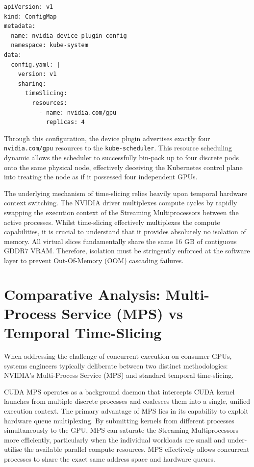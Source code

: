 \begin{listing}[H]
\begin{verbatim}
apiVersion: v1
kind: ConfigMap
metadata:
  name: nvidia-device-plugin-config
  namespace: kube-system
data:
  config.yaml: |
    version: v1
    sharing:
      timeSlicing:
        resources:
          - name: nvidia.com/gpu
            replicas: 4
\end{verbatim}
\caption{NVIDIA Kubernetes Device Plugin Time-Slicing Configuration specifying four logical replicas.}
\label{lst:nvidia_time_slicing}
\end{listing}



Through this configuration, the device plugin advertises exactly four \texttt{nvidia.com/gpu} resources to the \texttt{kube-scheduler}. This resource scheduling dynamic allows the scheduler to successfully bin-pack up to four discrete pods onto the same physical node, effectively deceiving the Kubernetes control plane into treating the node as if it possessed four independent GPUs.

The underlying mechanism of time-slicing relies heavily upon temporal hardware context switching. The NVIDIA driver multiplexes compute cycles by rapidly swapping the execution context of the Streaming Multiprocessors between the active processes. Whilst time-slicing effectively multiplexes the compute capabilities, it is crucial to understand that it provides absolutely no isolation of memory. All virtual slices fundamentally share the same 16 GB of contiguous GDDR7 VRAM. Therefore, isolation must be stringently enforced at the software layer to prevent Out-Of-Memory (OOM) cascading failures.

\section{Comparative Analysis: Multi-Process Service (MPS) vs Temporal Time-Slicing}
\label{sec:mps_vs_time_slicing}

When addressing the challenge of concurrent execution on consumer GPUs, systems engineers typically deliberate between two distinct methodologies: NVIDIA's Multi-Process Service (MPS) and standard temporal time-slicing.

CUDA MPS operates as a background daemon that intercepts CUDA kernel launches from multiple discrete processes and coalesces them into a single, unified execution context. The primary advantage of MPS lies in its capability to exploit hardware queue multiplexing. By submitting kernels from different processes simultaneously to the GPU, MPS can saturate the Streaming Multiprocessors more efficiently, particularly when the individual workloads are small and under-utilise the available parallel compute resources. MPS effectively allows concurrent processes to share the exact same address space and hardware queues.

